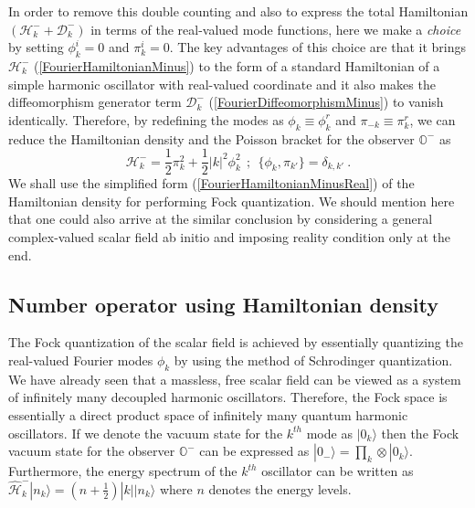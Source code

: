 \documentclass[aps,12pt,showpacs]{revtex4-2}
\def\observerminus{\mathbb{O}^{-}}
\begin{document}
In order to remove this double counting and also to express the total 
Hamiltonian $(\mathcal{H}_k^{-} + \mathcal{D}_k^{-})$  in terms of the 
real-valued mode functions, here we make a \emph{choice} by setting $\phi_{k}^i 
= 0$ and $\pi_{k}^i = 0$. The key advantages of this choice are that it 
brings $\mathcal{H}_k^{-}$ (\ref{FourierHamiltonianMinus}) to the form of a 
standard Hamiltonian of a simple harmonic oscillator with real-valued 
coordinate and it also makes the diffeomorphism generator term 
$\mathcal{D}_k^{-}$ (\ref{FourierDiffeomorphismMinus}) to vanish identically. 
Therefore, by redefining the modes as $\phi_{k} \equiv \phi_{k}^r$ and  
$\pi_{-k} \equiv \pi_{k}^r$, we can reduce the Hamiltonian density and
the Poisson bracket for the observer $\observerminus$ as 
%
\begin{equation}\label{FourierHamiltonianMinusReal}
\mathcal{H}_k^{-} = \frac{1}{2} \pi_{k}^2 + \frac{1}{2} |k|^2\phi_{k}^2
~~;~~  \{\phi_{k}, \pi_{k'}\} = \delta_{k,k'} ~.
\end{equation}
%
We shall use the simplified form (\ref{FourierHamiltonianMinusReal}) 
of the Hamiltonian density for performing Fock quantization. We should mention 
here that one could also arrive at the similar conclusion by considering a 
general complex-valued scalar field ab initio \cite{book:ADas,book:Peskin}
and imposing reality condition only at the end.





\subsection{Number operator using Hamiltonian density}


The Fock quantization of the scalar field is achieved by essentially quantizing 
the real-valued Fourier modes $\phi_{k}$ by using the method of Schrodinger 
quantization. We have already seen that a massless, free scalar field can be 
viewed as a system of infinitely many decoupled harmonic oscillators. Therefore, 
the Fock space is essentially a direct product space of infinitely many quantum 
harmonic oscillators. If we denote the vacuum state for the $k^{th}$ mode as 
$|0_k\rangle$ then the Fock vacuum state for the observer $\observerminus$ can 
be expressed as $|0_{-}\rangle = \prod_{k} \otimes |0_k\rangle$. Furthermore, 
the energy spectrum of the $k^{th}$ oscillator can be written as 
$\hat{\mathcal{H}}_{k}^{-} |n_k\rangle = (n+\frac{1}{2})|k| |n_k\rangle$ where 
$n$ denotes the energy levels.
\end{document}

